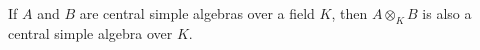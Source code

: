 If $A$ and $B$ are central simple algebras over a field $K$, then $A \otimes_K B$ is also a central simple algebra over $K$.
